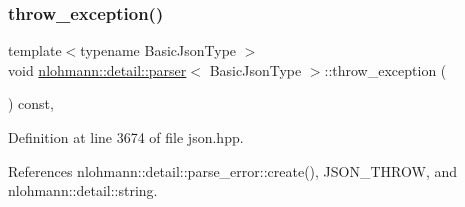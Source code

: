 \subsubsection{\texorpdfstring{throw\+\_\+exception()}{throw\_exception()}}
{\footnotesize\ttfamily template$<$typename Basic\+Json\+Type $>$ \\
void \hyperlink{classnlohmann_1_1detail_1_1parser}{nlohmann\+::detail\+::parser}$<$ Basic\+Json\+Type $>$\+::throw\+\_\+exception (\begin{DoxyParamCaption}{ }\end{DoxyParamCaption}) const\hspace{0.3cm}{\ttfamily [inline]}, {\ttfamily [private]}}



Definition at line 3674 of file json.\+hpp.



References nlohmann\+::detail\+::parse\+\_\+error\+::create(), J\+S\+O\+N\+\_\+\+T\+H\+R\+OW, and nlohmann\+::detail\+::string.


